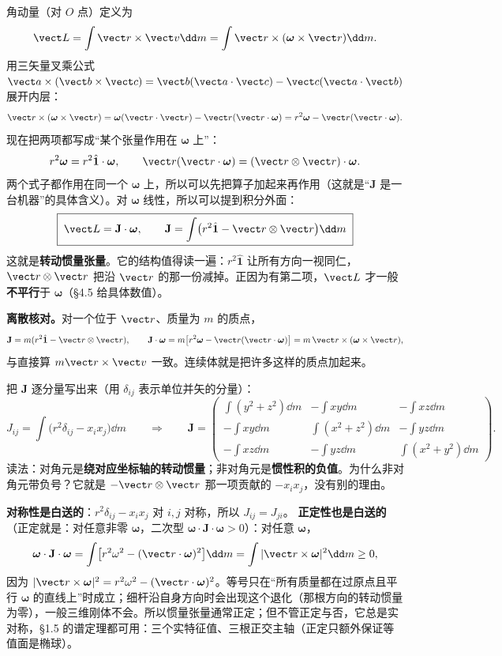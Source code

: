 \documentclass[11pt]{ctexart}
\newcommand{\ten}[1]{\mathbf{#1}}
\newcommand{\unitd}{\hat{\ten{1}}}
\let\origsubhdr\subhdr
\renewcommand{\subhdr}[1]{\par\needspace{3\baselineskip}\origsubhdr{#1}}
\begin{document}
角动量（对 $O$ 点）定义为
\[
\vect L=\int\vect r\times\vect v\dd m
=\int\vect r\times(\boldsymbol\omega\times\vect r)\dd m .
\]
用三矢量叉乘公式 $\vect a\times(\vect b\times\vect c)=\vect b(\vect a\cdot\vect c)-\vect c(\vect a\cdot\vect b)$ 展开内层：
\[
\vect r\times(\boldsymbol\omega\times\vect r)
=\boldsymbol\omega(\vect r\cdot\vect r)-\vect r(\vect r\cdot\boldsymbol\omega)
=r^2\boldsymbol\omega-\vect r(\vect r\cdot\boldsymbol\omega).
\]
现在把两项都写成“某个张量作用在 $\boldsymbol\omega$ 上”：
\[
r^2\boldsymbol\omega=r^2\unitd\cdot\boldsymbol\omega,
\qquad
\vect r(\vect r\cdot\boldsymbol\omega)=(\vect r\otimes\vect r)\cdot\boldsymbol\omega .
\]
两个式子都作用在同一个 $\boldsymbol\omega$ 上，所以可以先把算子加起来再作用（这就是“$\ten J$ 是一台机器”的具体含义）。对 $\boldsymbol\omega$ 线性，所以可以提到积分外面：
\[
\boxed{\;\vect L=\ten J\cdot\boldsymbol\omega,\qquad
\ten J=\int\bigl(r^2\unitd-\vect r\otimes\vect r\bigr)\dd m\;}
\]
这就是\textbf{转动惯量张量}。它的结构值得读一遍：$r^2\unitd$ 让所有方向一视同仁，$\vect r\otimes\vect r$ 把沿 $\vect r$ 的那一份减掉。正因为有第二项，$\vect L$ 才一般\textbf{不平行}于 $\boldsymbol\omega$（§4.5 给具体数值）。

\textbf{离散核对。}对一个位于 $\vect r$、质量为 $m$ 的质点，
\[
\ten J=m(r^2\unitd-\vect r\otimes\vect r),
\qquad
\ten J\cdot\boldsymbol\omega=m\bigl[r^2\boldsymbol\omega-\vect r(\vect r\cdot\boldsymbol\omega)\bigr]=m\,\vect r\times(\boldsymbol\omega\times\vect r),
\]
与直接算 $m\vect r\times\vect v$ 一致。连续体就是把许多这样的质点加起来。


把 $\ten J$ 逐分量写出来（用 $\delta_{ij}$ 表示单位并矢的分量）：
\[
J_{ij}=\int\bigl(r^2\delta_{ij}-x_ix_j\bigr)\dd m
\qquad\Longrightarrow\qquad
\ten J=
\begin{pmatrix}
\int(y^2+z^2)\dd m & -\int xy\dd m & -\int xz\dd m\\[3pt]
-\int xy\dd m & \int(x^2+z^2)\dd m & -\int yz\dd m\\[3pt]
-\int xz\dd m & -\int yz\dd m & \int(x^2+y^2)\dd m
\end{pmatrix}.
\]
读法：对角元是\textbf{绕对应坐标轴的转动惯量}；非对角元是\textbf{惯性积的负值}。为什么非对角元带负号？它就是 $-\vect r\otimes\vect r$ 那一项贡献的 $-x_ix_j$，没有别的理由。

\textbf{对称性是白送的}：$r^2\delta_{ij}-x_ix_j$ 对 $i,j$ 对称，所以 $J_{ij}=J_{ji}$。
\textbf{正定性也是白送的}（正定就是：对任意非零 $\boldsymbol\omega$，二次型 $\boldsymbol\omega\cdot\ten J\cdot\boldsymbol\omega>0$）：对任意 $\boldsymbol\omega$，
\[
\boldsymbol\omega\cdot\ten J\cdot\boldsymbol\omega
=\int\bigl[r^2\omega^2-(\vect r\cdot\boldsymbol\omega)^2\bigr]\dd m
=\int|\vect r\times\boldsymbol\omega|^2\dd m\ge0,
\]
因为 $|\vect r\times\boldsymbol\omega|^2=r^2\omega^2-(\vect r\cdot\boldsymbol\omega)^2$。等号只在“所有质量都在过原点且平行 $\boldsymbol\omega$ 的直线上”时成立；细杆沿自身方向时会出现这个退化（那根方向的转动惯量为零），一般三维刚体不会。所以惯量张量通常正定；但不管正定与否，它总是实对称，§1.5 的谱定理都可用：三个实特征值、三根正交主轴（正定只额外保证等值面是椭球）。
\end{document}
